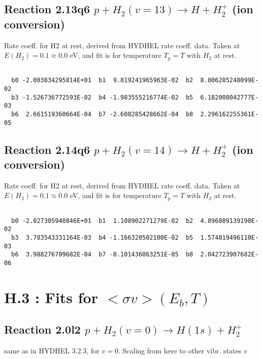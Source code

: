 \documentclass[12pt,dvipdfmx]{article}
\begin{document}
\subsection{
Reaction 2.13q6
$ p + H_2(v=13) \rightarrow H + H_2^+$ (ion conversion)
}
Rate coeff. for H2 at rest, derived from HYDHEL rate coeff. data.
Taken at $E(H_2) = 0.1 \approx 0.0$ eV,  and fit is for temperature $T_p=T$ with $H_2$ at rest.

\begin{small}\begin{verbatim}

  b0 -2.003834295814E+01  b1  9.819241965963E-02  b2  8.006285248099E-02
  b3 -1.526736772593E-02  b4 -1.983555216774E-02  b5  6.182008042777E-03
  b6  2.661519360664E-04  b7 -2.608285428662E-04  b8  2.296162255361E-05

\end{verbatim}\end{small}

\newpage
\subsection{
Reaction 2.14q6
$ p + H_2(v=14) \rightarrow H + H_2^+$ (ion conversion)
}
Rate coeff. for H2 at rest, derived from HYDHEL rate coeff. data.
Taken at $E(H_2) = 0.1 \approx 0.0$ eV,  and fit is for temperature $T_p=T$ with $H_2$ at rest.

\begin{small}\begin{verbatim}

  b0 -2.027305940846E+01  b1  1.108902271279E-02  b2  4.896809139190E-02
  b3  3.783543331164E-03  b4 -1.166320502100E-02  b5  1.574819496110E-03
  b6  3.988276709682E-04  b7 -8.101436063251E-05  b8  2.042723907682E-06

\end{verbatim}\end{small}

\newpage

\newpage
\section{H.3 :  Fits for $<\sigma v> (E_b,T)$}

\subsection{
Reaction 2.0l2 $   p + H_2(v=0) \rightarrow H(1s) + H_2^+$}
same as in HYDHEL 3.2.3, for $v=0$. Scaling from here to other vibr. states $v$
\end{document}
